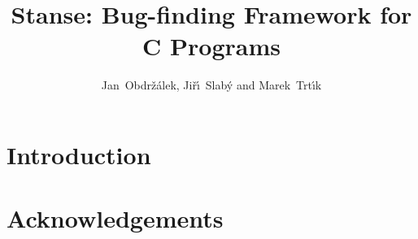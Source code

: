 \documentclass{llncs}
\begin{document}
\title{Stanse: Bug-finding Framework for C Programs}
\author{Jan~Obdr\v{z}\'alek, Ji\v{r}\'\i~Slab\'y and Marek~Trt\'{\i}k}

\maketitle

\begin{abstract}
\end{abstract}

\section{Introduction}

\section{Acknowledgements}



\end{document}
